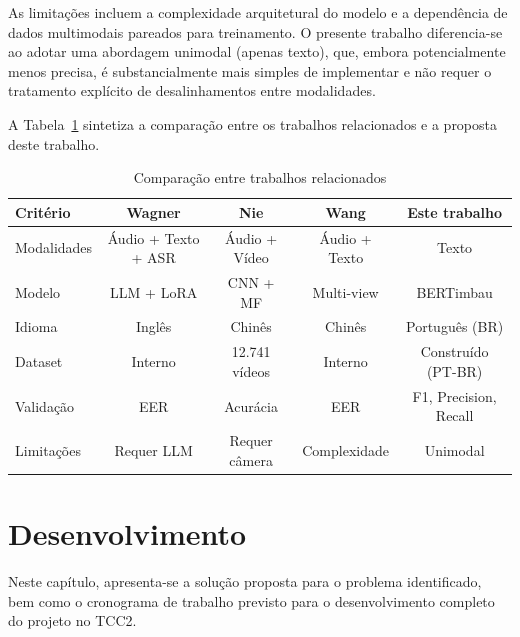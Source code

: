 \documentclass[
    12pt,                %
    openright,           %
    oneside,             %
    a4paper,             %
    english,             %
    brazil               %
]{abntex2}
\begin{document}
As limitações incluem a complexidade arquitetural do modelo e a dependência de dados multimodais pareados para treinamento. O presente trabalho diferencia-se ao adotar uma abordagem unimodal (apenas texto), que, embora potencialmente menos precisa, é substancialmente mais simples de implementar e não requer o tratamento explícito de desalinhamentos entre modalidades.

\vspace{0.5cm}

A Tabela~\ref{tab:trabalhos_relacionados} sintetiza a comparação entre os trabalhos relacionados e a proposta deste trabalho.

\begin{table}[htb]
    \centering
    \caption{Comparação entre trabalhos relacionados}
    \label{tab:trabalhos_relacionados}
    \begin{tabular}{l|c|c|c|c}
        \toprule
        \textbf{Critério} & \textbf{Wagner} & \textbf{Nie} & \textbf{Wang} & \textbf{Este trabalho} \\
        \midrule
        Modalidades  & Áudio + Texto + ASR & Áudio + Vídeo & Áudio + Texto & Texto \\
        \midrule
        Modelo       & LLM + LoRA    & CNN + MF      & Multi-view    & BERTimbau \\
        \midrule
        Idioma       & Inglês        & Chinês        & Chinês        & Português (BR) \\
        \midrule
        Dataset      & Interno       & 12.741 vídeos & Interno       & Construído (PT-BR) \\
        \midrule
        Validação    & EER           & Acurácia      & EER           & F1, Precision, Recall \\
        \midrule
        Limitações   & Requer LLM    & Requer câmera & Complexidade  & Unimodal \\
        \bottomrule
    \end{tabular}
\end{table}

\chapter{Desenvolvimento}
\label{cap:desenvolvimento}

Neste capítulo, apresenta-se a solução proposta para o problema identificado, bem como o cronograma de trabalho previsto para o desenvolvimento completo do projeto no TCC2.
\end{document}
